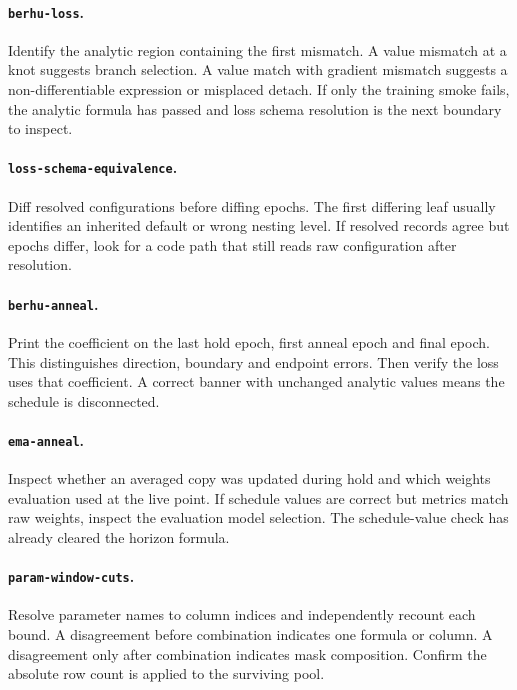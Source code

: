 \documentclass[10pt,aps,prd,twocolumn,nofootinbib]{revtex4-2}
\newcommand{\code}[1]{\texttt{#1}}
\begin{document}
\paragraph{\code{berhu-loss}.}
Identify the analytic region containing the first mismatch.  A value mismatch
at a knot suggests branch selection.  A value match with gradient mismatch
suggests a non-differentiable expression or misplaced detach.  If only the
training smoke fails, the analytic formula has passed and loss schema
resolution is the next boundary to inspect.

\paragraph{\code{loss-schema-equivalence}.}
Diff resolved configurations before diffing epochs.  The first differing leaf
usually identifies an inherited default or wrong nesting level.  If resolved
records agree but epochs differ, look for a code path that still reads raw
configuration after resolution.

\paragraph{\code{berhu-anneal}.}
Print the coefficient on the last hold epoch, first anneal epoch and final
epoch.  This distinguishes direction, boundary and endpoint errors.  Then
verify the loss uses that coefficient.  A correct banner with unchanged
analytic values means the schedule is disconnected.

\paragraph{\code{ema-anneal}.}
Inspect whether an averaged copy was updated during hold and which weights
evaluation used at the live point.  If schedule values are correct but metrics
match raw weights, inspect the evaluation model selection.  The schedule-value
check has already cleared the horizon formula.

\paragraph{\code{param-window-cuts}.}
Resolve parameter names to column indices and independently recount each
bound.  A disagreement before combination indicates one formula or column.
A disagreement only after combination indicates mask composition.  Confirm
the absolute row count is applied to the surviving pool.
\end{document}
